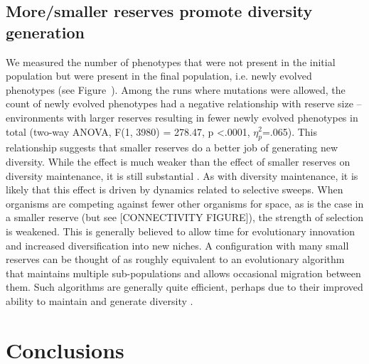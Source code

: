 \documentclass[letterpaper]{article}
\begin{document}
\subsection{More/smaller reserves promote diversity generation}
        
		We measured the number of phenotypes that were not present in the initial population but were present in the final population, i.e. newly evolved phenotypes (see Figure~\label{fig:diversitygenerationmaintenance}). Among the runs where mutations were allowed, the count of newly evolved phenotypes had a negative relationship with reserve size – environments with larger reserves resulting in fewer newly evolved phenotypes in total (two-way ANOVA, F(1, 3980) = 278.47, p \textless .0001, $\eta_{p}^{2}$=.065). This relationship suggests that smaller reserves do a better job of generating new diversity. While the effect is much weaker than the effect of smaller reserves on diversity maintenance, it is still substantial \citep{lakens_calculating_2013}. As with diversity maintenance, it is likely that this effect is driven by dynamics related to selective sweeps. When organisms are competing against fewer other organisms for space, as is the case in a smaller reserve (but see [CONNECTIVITY FIGURE]), the strength of selection is weakened. This is generally believed to allow time for evolutionary innovation and increased diversification into new niches. A configuration with many small reserves can be thought of as roughly equivalent to an evolutionary algorithm that maintains multiple sub-populations and allows occasional migration between them. Such algorithms are generally quite efficient, perhaps due to their improved ability to maintain and generate diversity \citep{tomassini_spatially_2005}. 
%
%
%
%
%
%

\section{Conclusions}
\end{document}
